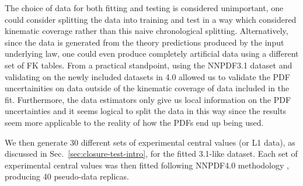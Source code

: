 The choice of data for both fitting and testing is
considered unimportant, one could consider splitting the data into training
and test in a way which considered kinematic coverage rather than this
naive chronological splitting. Alternatively, since the data is generated from
the theory predictions produced by the input underlying law, one could even
produce completely artificial data using a different set of FK tables. From a
practical standpoint, using the NNPDF3.1 dataset and validating on the newly
included
datasets in 4.0 allowed us to validate the PDF uncertainities on data outside
of the kinematic coverage of data included in the fit. Furthermore, the data estimators
only give us local information on the PDF uncertainties and it seems
logical to split the data in this way since the results seem more applicable to
the reality of how the PDFs end up being used.

We then generate 30 different sets of experimental central values
(or L1 data), as discussed in Sec.~\ref{sec:closure-test-intro}, for the
fitted 3.1-like dataset.
Each set of experimental central values was then
fitted following NNPDF4.0 methodology \cite{NNPDF40},
producing 40 pseudo-data replicas.